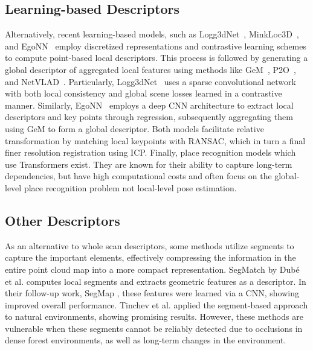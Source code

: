 \subsection*{Learning-based Descriptors} 
Alternatively, recent learning-based models, such as Logg3dNet~\cite{vidanapathirana2022icra}, MinkLoc3D~\cite{komorowski2021wacv}, and EgoNN~\cite{komorowski2022ral} employ discretized representations and contrastive learning schemes to compute point-based local descriptors. This process is followed by generating a global descriptor of aggregated local features using methods like GeM~\cite{radenovic2019pami}, P2O~\cite{vidanapathirana2021icra}, and NetVLAD~\cite{arandjelovic2018pami}.  
Particularly, Logg3dNet~\cite{vidanapathirana2022icra} uses a sparse convolutional network with both local consistency and global scene losses learned in a contrastive manner. Similarly, EgoNN~\cite{komorowski2022ral} employs a deep CNN architecture to extract local descriptors and key points through regression, subsequently aggregating them using GeM to form a global descriptor.
Both models facilitate relative transformation by matching local keypoints with RANSAC, which in turn a final finer resolution registration using ICP. 
Finally, place recognition models which use Transformers \cite{zhang2019cvpr, xia2021cvpr, zhou2021icra, xu2021transloc3d} exist. They are known for their ability to capture long-term dependencies, but have high computational costs and often focus on the global-level place recognition problem not local-level pose estimation.

\subsection*{Other Descriptors} 
As an alternative to whole scan descriptors, some methods utilize segments to capture the important elements, effectively compressing the information in the entire point cloud map into a more compact representation. SegMatch \cite{dube2017icra} by Dubé et al. computes local segments and extracts geometric features as a descriptor. In their follow-up work, SegMap \cite{dube2018rss}, these features were learned via a CNN, showing improved overall performance. Tinchev et al. \cite{tinchev2018iros, tinchev2019ral} applied the segment-based approach to natural environments, showing promising results. However, these methods are vulnerable when these segments cannot be reliably detected due to occlusions in dense forest environments, as well as long-term changes in the environment.


